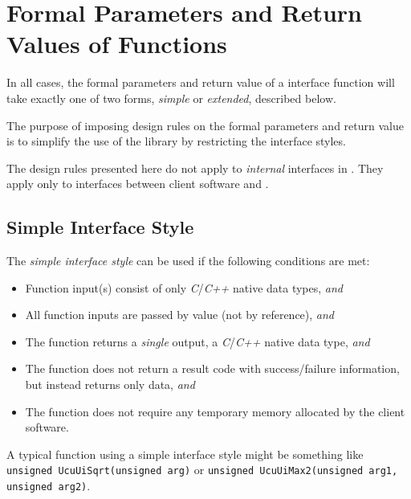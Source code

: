 \section{Formal Parameters and Return Values of Functions}
\label{cldd0:sfcp0}

In all cases, the formal parameters and return value of a 
\emph{\productbasenameshort{}} interface function will take 
exactly one of two forms, \emph{simple} or \emph{extended}, 
described below.  

The purpose of imposing design rules on the formal 
parameters and return value is to simplify the use of the 
library by restricting the \emph{\productbasenameshort{}} 
interface styles.  

The design rules presented here do not apply to 
\emph{internal} interfaces in 
\emph{\productbasenameshort{}}\@.  They apply only to 
interfaces between client software and 
\emph{\productbasenameshort{}}.  


\subsection{Simple Interface Style}
\label{cldd0:sfcp0:sifs0}

The \emph{simple interface style} can be used if the 
following conditions are met: 

\begin{itemize}
\item Function input(s) consist of only \emph{C}/\emph{C++}
      native data types, \emph{and}
\item All function inputs are passed by value (not by
      reference), \emph{and}
\item The function returns a \emph{single} output, 
      a \emph{C}/\emph{C++}
      native data type, \emph{and}
\item The function does not return a result code with
      success/failure
      information, but instead returns only data, \emph{and}
\item The function does not require any temporary memory
      allocated by the client software.
\end{itemize}

A typical function using a simple interface style might be 
something like \texttt{unsigned UcuUiSqrt(unsigned arg)} or 
\texttt{unsigned UcuUiMax2(unsigned arg1, unsigned arg2)}.  


